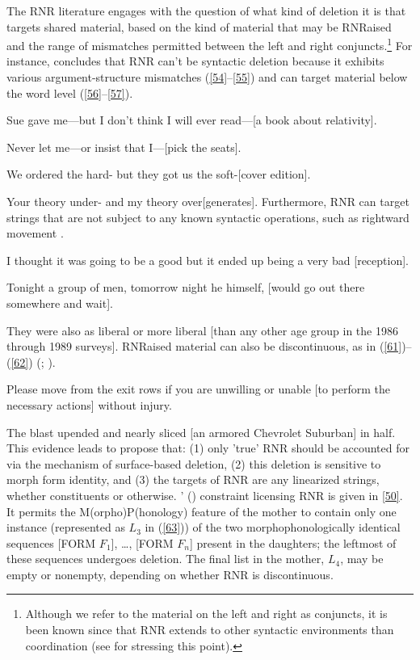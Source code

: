 \documentclass[output=paper
                ,modfonts
                ,nonflat
	        ,collection
	        ,collectionchapter
	        ,collectiontoclongg
 	        ,biblatex
                ,babelshorthands
                ,newtxmath
                ,draftmode
                ,colorlinks, citecolor=brown
]{./langsci/langscibook}
\begin{document}
{The RNR literature engages with the question of what kind of deletion it is that targets shared material, based on the kind of material that may be RNRaised and the range of mismatches permitted between the left and right conjuncts.\footnote{Although we refer to the material on the left and right as conjuncts, it is been known since \citet{Hudson1976, Hudson1989} that RNR extends to other syntactic environments than coordination (see \citealt{Chaves2014} for stressing this point).} For instance, \citet[839--840]{Chaves2014} concludes that RNR can't be syntactic deletion because it exhibits various argument-structure mismatches (\ref{54}--\ref{55}) and can target material below the word level (\ref{56}--\ref{57}).


\ea Sue gave me---but I don't think I will ever read---[a book about relativity]. \label{54}\z

\ea Never let me---or insist that I---[pick the seats].\label{55}\z

\ea We ordered the hard- but they got us the soft-[cover edition].\label{56}\z

\ea Your theory under- and my theory over[generates].\label{57}\z
Furthermore, RNR can target strings that are not subject to any known syntactic operations, such as rightward movement \citep[865]{Chaves2014}.

\ea I thought it was going to be a good but it ended up being a very bad [reception].\label{58}\z

\ea Tonight a group of men, tomorrow night he himself, [would go out there somewhere and wait].\label{59}\z

\ea They were also as liberal or more liberal [than any other age group in the 1986 through 1989 surveys].\label{60}\z
RNRaised material can also be discontinuous, as in (\ref{61})--(\ref{62}) (\citealt[868]{Chaves2014}; \citealt[238--240]{Whitman2009}).

\ea Please move from the exit rows if you are unwilling or unable [to perform the necessary actions] without injury.\label{61}\z

\ea The blast upended and nearly sliced [an armored Chevrolet Suburban] in half.\label{62}\z
This evidence leads \citet{Chaves2014} to propose that: (1) only 'true' RNR should be accounted for via the mechanism of surface-based deletion, (2) this deletion is sensitive to morph form identity, and (3) the targets of RNR are any linearized strings, whether constituents or otherwise. \citeauthor{Chaves2014}' (\citeyear[874]{Chaves2014}) constraint licensing RNR is given in \ref{50}. It permits the M(orpho)P(honology) feature of the mother to contain only one instance (represented as $L_{3}$ in (\ref{63})) of the two morphophonologically identical sequences [FORM $F_{1}$], \ldots, [FORM $F_{n}$] present in the daughters; the leftmost of these sequences undergoes deletion. The final list in the mother, $L_{4}$, may be empty or nonempty, depending on whether RNR is discontinuous.

}
\end{document}
